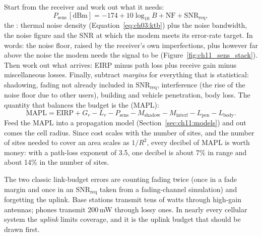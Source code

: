 Start from the receiver and work out what it needs:
\begin{equation}
P_{\text{sens}}\,[\mathrm{dBm}]=-174+10\log_{10}B+\mathrm{NF}+\mathrm{SNR}_{\text{req}},
\label{eq:ch11:sens}
\end{equation}
the : thermal noise density (Equation~\eqref{eq:ch03:ktb}) plus the
noise bandwidth, the noise figure and the SNR at which the modem meets its error-rate target.
In words: the noise floor, raised by the receiver's own imperfections, plus however far above
the noise the modem needs the signal to be (Figure~\ref{fig:ch11_sens_stack}). Then work out what arrives: EIRP minus path loss
plus receive gain minus miscellaneous losses. Finally, subtract \emph{margins} for everything
that is statistical: shadowing, fading not already included in $\mathrm{SNR}_{\text{req}}$,
interference (the rise of the noise floor due to other users), building and vehicle penetration,
body loss. The quantity that balances the budget is the 
(MAPL):
\begin{equation}
\mathrm{MAPL}=\mathrm{EIRP}+G_r-L_r-P_{\text{sens}}-M_{\text{shadow}}-M_{\text{interf}}
-L_{\text{pen}}-L_{\text{body}}.
\end{equation}
Feed the MAPL into a propagation model (Section~\ref{sec:ch11:models}) and out comes the cell
radius. Since cost scales with the number of sites, and the number of sites needed to cover
an area scales as $1/R^2$, every decibel of MAPL is worth money: with a path-loss exponent of
3.5, one decibel is about 7\% in range and about 14\% in the number of sites.


\begin{pitfall}
The two classic link-budget errors are counting fading twice (once in a fade margin and once
in an $\mathrm{SNR}_{\text{req}}$ taken from a fading-channel simulation) and forgetting the
uplink. Base stations transmit tens of watts through high-gain antennas; phones transmit
200\,mW through lossy ones. In nearly every cellular system the \emph{uplink} limits coverage,
and it is the uplink budget that should be drawn first.
\end{pitfall}

